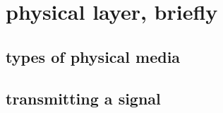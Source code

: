 
\section{physical layer, briefly}

\subsection{types of physical media}


\subsection{transmitting a signal}

